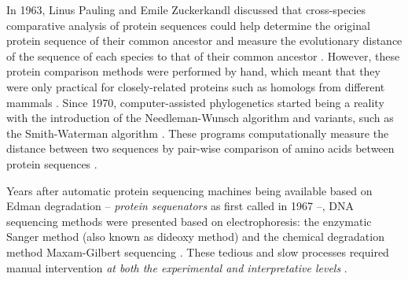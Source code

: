 In 1963, Linus Pauling and Emile Zuckerkandl discussed that cross-species comparative analysis of protein sequences could help determine the original protein sequence of their common ancestor and measure the evolutionary distance of the sequence of each species to that of their common ancestor \cite{pauling:1963uo}. However, these protein comparison methods were performed by hand, which meant that they were only practical for closely-related proteins such as homologs from different mammals \cite{gauthier:2018ws}. Since 1970, computer-assisted phylogenetics started being a reality with the introduction of the Needleman-Wunsch algorithm \cite{needleman:1970vq} and variants, such as the Smith-Waterman algorithm \cite{smith:1981up}. These programs computationally measure the distance between two sequences by pair-wise comparison of amino acids between protein sequences \cite{needleman:1970vq,smith:1981up}.




Years after automatic protein sequencing machines being available based on Edman degradation -- \emph{protein sequenators} as first called in 1967 \cite{edman:1967tc} --, DNA sequencing methods were presented based on electrophoresis: the enzymatic Sanger method (also known as dideoxy method) \cite{sanger:1977vp} and the chemical degradation method Maxam-Gilbert sequencing \cite{maxam:1977vy}. These tedious and slow processes required manual intervention \emph{at both the experimental and interpretative levels} \cite{hood:1987va}.


